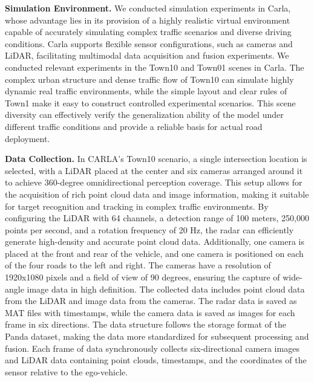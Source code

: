 \documentclass[lettersize,journal]{IEEEtran}
\begin{document}
\textbf{Simulation Environment.}
We conducted simulation experiments in Carla, whose advantage lies in its provision of a highly realistic virtual environment capable of accurately simulating complex traffic scenarios and diverse driving conditions. 
Carla supports flexible sensor configurations, such as cameras and LiDAR, facilitating multimodal data acquisition and fusion experiments\cite{Alpher22e}. 
We conducted relevant experiments in the Town10 and Town01 scenes in Carla.
The complex urban structure and dense traffic flow of Town10 can simulate highly dynamic real traffic environments, while the simple layout and clear rules of Town1 make it easy to construct controlled experimental scenarios.
This scene diversity can effectively verify the generalization ability of the model under different traffic conditions and provide a reliable basis for actual road deployment.

\textbf{Data Collection.}
In CARLA's Town10 scenario, a single intersection location is selected, with a LiDAR placed at the center and six cameras arranged around it to achieve 360-degree omnidirectional perception coverage. 
This setup allows for the acquisition of rich point cloud data and image information, making it suitable for target recognition and tracking in complex traffic environments. 
By configuring the LiDAR with 64 channels, a detection range of 100 meters, 250,000 points per second, and a rotation frequency of 20 Hz, the radar can efficiently generate high-density and accurate point cloud data. 
Additionally, one camera is placed at the front and rear of the vehicle, and one camera is positioned on each of the four roads to the left and right. 
The cameras have a resolution of 1920x1080 pixels and a field of view of 90 degrees, ensuring the capture of wide-angle image data in high definition. 
The collected data includes point cloud data from the LiDAR and image data from the cameras. 
The radar data is saved as MAT files with timestamps, while the camera data is saved as images for each frame in six directions. 
The data structure follows the storage format of the Panda dataset, making the data more standardized for subsequent processing and fusion\cite{Alpher21c}. 
Each frame of data synchronously collects six-directional camera images and LiDAR data containing point clouds, timestamps, and the coordinates of the sensor relative to the ego-vehicle.
\end{document}
